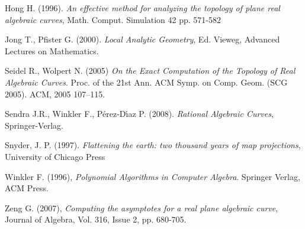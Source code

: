 \documentclass{elsart}
\begin{document}
\begin{thebibliography}{56}
 Hong H. (1996). {\it An effective
method for analyzing the topology of plane real algebraic curves},
Math. Comput. Simulation 42 pp. 571-582 


 Jong T., Pfister G. (2000). {\it Local Analytic Geometry}, Ed. Vieweg, Advanced Lectures on Mathematics.












 Seidel R., Wolpert N. (2005) {\it On the Exact Computation of the
Topology of Real Algebraic Curves}. Proc. of the 21st Ann. ACM Symp. on Comp. Geom. (SCG 2005). ACM, 2005 107--115.









 Sendra J.R., Winkler F., P\'erez-D\'{\i}az P. (2008). {\it Rational Algebraic Curves}, Springer-Verlag.

 Snyder, J. P. (1997). {\it Flattening the earth: two thousand years of map projections}, University of Chicago Press





 Winkler F. (1996), {\it Polynomial Algorithms in Computer Algebra}. Springer Verlag, ACM Press.

 Zeng G. (2007), {\it Computing the asymptotes for a real plane algebraic curve},
Journal of Algebra, Vol. 316, Issue 2, pp. 680-705.

\end{thebibliography}
\end{document}
